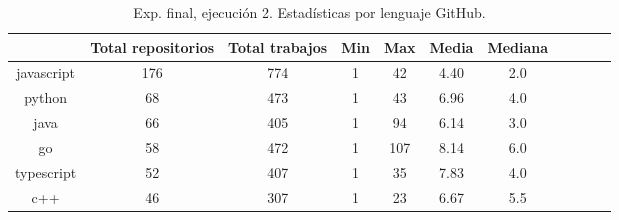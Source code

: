 \begin{table}
  \centering
  \caption{Exp. final, ejecución 2. Estadísticas por lenguaje GitHub.}
  \label{tab:tabla_f2_4}

\begin{footnotesize}
\renewcommand{\arraystretch}{1.5} %
\begin{tabular}{ccccccccccc}
  \hline
  {} &  Total repositorios &  Total trabajos &  Min &  Max &  Media &  Mediana \\
  \hline
  javascript    &        176 &         774 &    1 &   42 &    4.40 &      2.0 \\
  python        &         68 &         473 &    1 &   43 &    6.96 &      4.0 \\
  java          &         66 &         405 &    1 &   94 &    6.14 &      3.0 \\
  go            &         58 &         472 &    1 &  107 &    8.14 &      6.0 \\
  typescript    &         52 &         407 &    1 &   35 &    7.83 &      4.0 \\
  c++           &         46 &         307 &    1 &   23 &    6.67 &      5.5 \\

\end{tabular}
\end{footnotesize}
\end{table}

